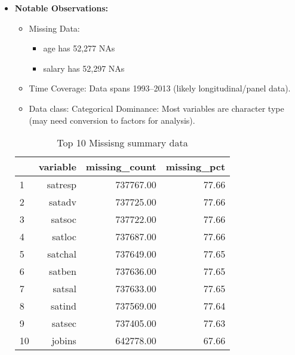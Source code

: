 \documentclass[12pt]{article}
\begin{document}
\begin{itemize}
            \item \textbf{Notable Observations:}
                \begin{itemize}
                    \item Missing Data:
                        \begin{itemize}
                            \item age has 52,277 NAs
                            \item salary has 52,297 NAs 
                        \end{itemize}
                    \item Time Coverage: Data spans 1993–2013 (likely longitudinal/panel data).
                    \item Data class: Categorical Dominance: Most variables are character type (may need conversion to factors for analysis).
                
                \end{itemize}  

\begin{table}[ht]
\centering
\caption{Top 10 Missisng summary data} 
\label{tab:missing_summary}
\begin{tabular}{|l|r|r|r|}
  \toprule
 & variable & missing\_count & missing\_pct \\ 
  \midrule
1 & satresp & 737767.00 & 77.66 \\           %
  2 & satadv & 737725.00 & 77.66 \\ 
  3 & satsoc & 737722.00 & 77.66 \\           %
  4 & satloc & 737687.00 & 77.66 \\ 
  5 & satchal & 737649.00 & 77.65 \\ 
  6 & satben & 737636.00 & 77.65 \\ 
  7 & satsal & 737633.00 & 77.65 \\ 
  8 & satind & 737569.00 & 77.64 \\ 
  9 & satsec & 737405.00 & 77.63 \\ 
  10 & jobins & 642778.00 & 67.66 \\ 
   \bottomrule
\end{tabular}
\end{table}

            
\end{itemize}
\end{document}
